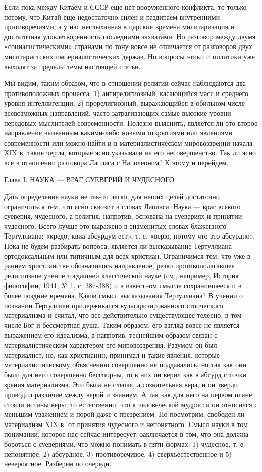 Если пока между Китаем и СССР еще нет вооруженного конфликта, то только потому,
что Китай еще недостаточно силен и раздираем внутренними противоречиями, а у
нас неслыханная в царские времена милитаризация и достаточная удовлетворенность
последними захватами. Но разговор между двумя «социалистическими» странами по
тону вовсе не отличается от разговоров двух милитаристских империалистических
держав. Но вопросы этики и политики уже выходят за пределы темы настоящей
статьи.

Мы видим, таким образом, что в отношении религии сейчас наблюдаются два
противоположных процесса: 1) антирелигиозный, касающийся масс и среднего уровня
интеллигенции; 2) прорелигиозный, выражающийся в обильном числе всевозможных
направлений, часто затрагивающих самые высокие уровни передовых мыслителей
современности. Полезно выяснить, является ли это второе направление вызванным
какими-либо новыми открытиями или явлениями современности или можно найти и в
материалистическом мировоззрении начала XIX в. такие черты, которые ясно
указывали на его несовершенство. Так ли ясно все в отношении разговора Лапласа
с Наполеоном? К этому и перейдем.

Глава I. НАУКА --- ВРАГ СУЕВЕРИЙ И ЧУДЕСНОГО

Дать определение науки не так-то легко, для наших целей достаточно ограничиться
тем, что ясно сквозит в словах Лапласа. Наука --- враг всякого суеверия,
чудесного, а религия, напротив, основана на суевериях и принятии чудесного.
Всего лучше это выражено в знаменитых словах блаженного Тертуллиана: «кредо,
квиа абсурдум ест», т. е. «верю, потому что это абсурдно». Пока не будем
разбирать вопроса, является ли высказывание Тертуллиана ортодоксальным или
типичным для всех христиан. Ограничимся тем, что уже в раннем христианстве
обозначилось направление, резко противополагавшее религиозное учение тогдашней
классической науке (см., например, История философии, 1941, № 1, с. 387-388) и
в известном смысле сохранившееся и в более поздние времена. Каков смысл
высказывания Тертуллиана? В учении о познании Тертуллиан придерживался
вульгаризированного стоического материализма и считал, что все действительно
существующее телесно, в том числе Бог и бессмертная душа. Таким образом, его
взгляд вовсе не является выражением его идеализма, а напротив, теснейшим
образом связан с материалистическим характером его мировоззрения. Разумом он
был материалист, но, как христианин, принимал и такие явления, которые
материалистическому объяснению
совершенно не поддавались, но так как они были для него совершенно бесспорны,
то в них он верил как в абсурд с точки зрения материализма. Это была не слепая,
а сознательная вера, и он твердо проводил различие между верой и знанием. А так
как для него на первом плане стояли истины веры, то естественно, что к
человеческой мудрости он относился с меньшим уважением и порой даже с
презрением. Но посмотрим, свободен ли материализм XIX в. от принятия чудесного
и непонятного. Смысл науки в том понимании, которое нас сейчас интересует,
заключается в том, что она должна бороться с суевериями, что можно понимать в
пяти формах: 1) чудесное, т. е. непонятное, 2) абсурдное, 3) противоречивое, 4)
сверхъестественное и 5) невероятное. Разберем по очереди.

